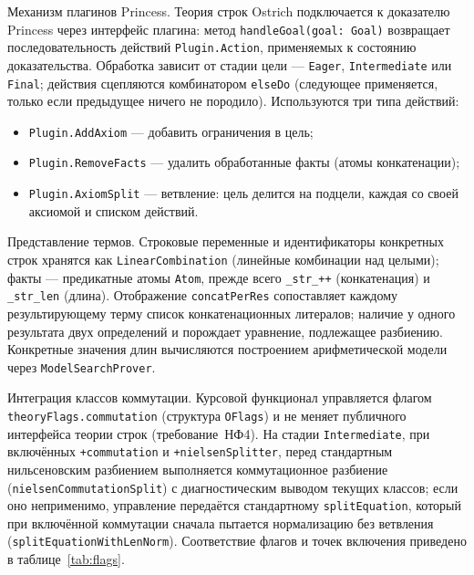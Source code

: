 \documentclass[14pt, russian]{scrartcl}
\begin{document}
Механизм плагинов Princess. Теория строк Ostrich подключается к доказателю
Princess через интерфейс плагина: метод \texttt{handleGoal(goal: Goal)} возвращает
последовательность действий \texttt{Plugin.Action}, применяемых к состоянию
доказательства. Обработка зависит от стадии цели --- \texttt{Eager},
\texttt{Intermediate} или \texttt{Final}; действия сцепляются комбинатором
\texttt{elseDo} (следующее применяется, только если предыдущее ничего не породило).
Используются три типа действий:
\begin{itemize}
\item \texttt{Plugin.AddAxiom} --- добавить ограничения в цель;
\item \texttt{Plugin.RemoveFacts} --- удалить обработанные факты (атомы конкатенации);
\item \texttt{Plugin.AxiomSplit} --- ветвление: цель делится на подцели, каждая со
  своей аксиомой и списком действий.
\end{itemize}

Представление термов. Строковые переменные и идентификаторы конкретных строк
хранятся как \texttt{LinearCombination} (линейные комбинации над целыми); факты ---
предикатные атомы \texttt{Atom}, прежде всего \verb|_str_++| (конкатенация) и
\verb|_str_len| (длина). Отображение \texttt{concatPerRes} сопоставляет каждому
результирующему терму список конкатенационных литералов; наличие у одного результата
двух определений и порождает уравнение, подлежащее разбиению. Конкретные значения длин
вычисляются построением арифметической модели через \texttt{ModelSearchProver}.

Интеграция классов коммутации. Курсовой функционал управляется флагом
\texttt{theoryFlags.commutation} (структура \texttt{OFlags}) и не меняет публичного
интерфейса теории строк (требование~НФ4). На стадии \texttt{Intermediate}, при
включённых \verb|+commutation| и \verb|+nielsenSplitter|, перед стандартным
нильсеновским разбиением выполняется коммутационное разбиение
(\texttt{nielsenCommutationSplit}) с диагностическим выводом текущих классов; если оно
неприменимо, управление передаётся стандартному \texttt{splitEquation}, который при
включённой коммутации сначала пытается нормализацию без ветвления
(\texttt{splitEquationWithLenNorm}). Соответствие флагов и точек включения приведено в
таблице~\ref{tab:flags}.
\end{document}
